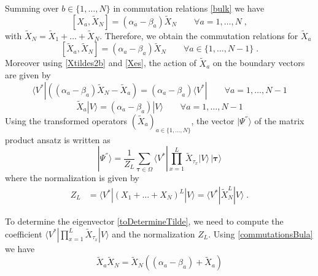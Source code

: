 \documentclass[10pt]{article}
\numberwithin{equation}{section}
\numberwithin{equation}{subsection}
\newcommand{\Xt}{\widetilde{X}}
\newcommand{\co}{\;,}
\newcommand{\dt}{\;.}
\begin{document}
Summing over $b\in \{1,\ldots,N\}$ in commutation relations \eqref{bulk} we have
\begin{equation} 
	\left[X_{a},\Xt_{N}\right]=(\alpha_{a}-\beta_{a})\Xt_{N}\qquad\forall a=1,\ldots,N\co
\end{equation}
with $\widetilde{X}_{N}=\widetilde{X}_{1}+\ldots+\widetilde{X}_{N}$. 
Therefore, we obtain the commutation relations for $\Xt_{a}$ 
\begin{equation}\label{commutationsBula}
	\left[\Xt_{a},\Xt_{N}\right]=(\alpha_{a}-\beta_{a})\Xt_{N}\qquad \forall a\in \{1,\ldots,N-1\}\dt
\end{equation}
Moreover using \eqref{Xtildes2b} and \eqref{Xes}, the action of $\Xt_{a}$ on the boundary vectors are given by 
\begin{equation}\label{commLEFT}
	\langle V^{*}|\left((\alpha_{a}-\beta_{a})\Xt_{N}-\Xt_{a}\right)=(\alpha_{a}-\beta_{a})\langle V^{*}|\qquad\forall a=1,\ldots,N-1
\end{equation}
\begin{equation}\label{commRIGHT}
	\Xt_{a} |V\rangle= (\alpha_{a}-\beta_{a})|V\rangle\qquad\forall a=1,\ldots,N-1
\end{equation} 
Using the transformed operators $(\widetilde{X}_{a})_{a\in\{1,\ldots,N\}}$, the vector $|\Psi^{''}\rangle$ of the matrix product ansatz is written as
\begin{equation}\label{toDetermineTilde}
	|\Psi^{''}\rangle = \frac{1}{Z_{L}}\sum_{\bm{\tau}\in \Omega}\langle V^{*}|\prod_{x=1}^{L}\widetilde{X}_{\tau_{x}}
	|V \rangle \,|\bm{\tau}\rangle
\end{equation}
where the normalization is given by 
\begin{align}
		Z_{L}&=\langle V^{*}|(X_{1}+\ldots+X_{N})^{L}|V\rangle=\langle V^{*}|\widetilde{X}_{N}^{L}|V\rangle\dt
\end{align}
\begin{comment}
The basis is 
$$
|\bm{n}\rangle =|n_{1}^{1},\ldots,n_{N}^{1}\rangle \otimes \ldots\otimes |n_{1}^{L},\ldots,n_{N}^{L}\rangle
$$
such that, for each site $x\in \{1,\ldots,L\}$, $|n^{x}\rangle=|n_{1}^{x},\ldots,n_{N}^{x}\rangle\in \Omega_{x}$. \\
\end{comment}
To determine the eigenvector \eqref{toDetermineTilde}, we need to compute the coefficient $\langle V^{*}|\prod_{x=1}^{L}\widetilde{X}_{\tau_{x}}
|V \rangle$ and the normalization $Z_{L}$. Using \eqref{commutationsBula} we have
\begin{equation}\label{UsefulRelation}
	\widetilde{X}_{a}\widetilde{X}_{N}=\widetilde{X}_{N}\left((\alpha_{a}-\beta_{a})+\widetilde{X}_{a}\right)
\end{equation}
\end{document}
